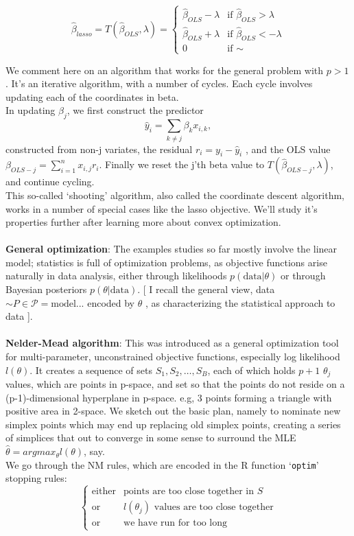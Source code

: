 \documentclass[11pt,a4paper]{article}
\begin{document}
\[
 \hat{\beta}_{lasso} = T( \hat{\beta}_{OLS}, \lambda )=
  \begin{cases}
   \hat{\beta}_{OLS}-\lambda & \text{if } \hat{\beta}_{OLS}>\lambda \\
   \hat{\beta}_{OLS}+\lambda       & \text{if } \hat{\beta}_{OLS}<-\lambda \\
   0 & \text{if } \sim
  \end{cases}
\]

We comment here on an algorithm that works for the general problem with $p > 1$.   It's an iterative algorithm, with a number of cycles. Each cycle involves updating each of the coordinates in beta.\\
In updating $\beta_j$, we first construct the predictor  $$\hat{y}_i = \sum_{k\neq j} \beta_k  x_{i,k},$$
constructed from non-j variates, the residual  $r_i = y_i - \hat{y}_i$ , and the OLS value
$\beta_{OLS-j} = \sum_{i=1}^n x_{i,j} r_i$.  Finally we reset the j'th beta value to $T( \hat{\beta}_{OLS-j}, \lambda)$, and continue cycling.\\
This so-called `shooting' algorithm, also called the coordinate descent algorithm, works in a number of special cases like the lasso objective.  We'll study it's properties further after learning more about convex optimization.\\\\
\textbf{General optimization}: The examples studies so far mostly involve the linear model; statistics is full of optimization problems, as objective functions arise naturally in data analysis, either through likelihoods $p(\text{data}|\theta)$ or through Bayesian posteriors $p(\theta|\text{data})$.   [ I recall the general view, data $\sim P \in \mathcal{P}=\text{model...}$ encoded by $\theta$ , as characterizing the statistical approach to data ].\\\\
\textbf{Nelder-Mead algorithm}: This was introduced as a general optimization tool for multi-parameter, unconstrained objective functions, especially log likelihood $l(\theta)$.  It creates a sequence of sets $S_1, S_2,\ldots , S_B$, each of which holds $p+1$ $\theta_j$ values, which are points in p-space, and set so that the points do not reside on a (p-1)-dimensional hyperplane in p-space. e.g, 3 points forming a triangle with positive area in 2-space.  We sketch out the basic plan, namely to nominate new simplex points which may end up replacing old simplex points, creating a series of simplices that out to converge in some sense to surround the MLE $\hat{\theta} = argmax_\theta l(\theta)$, say.\\
We go through the NM rules, which are encoded in the R function `\texttt{optim}' stopping rules:
\[
  \begin{cases}
   \text{either} & \text{points are too close together in }S \\
   \text{or} & l(\theta_j)\text{ values are too close together}  \\
   \text{or} & \text{we have run for too long}
  \end{cases}
\]
\end{document}
